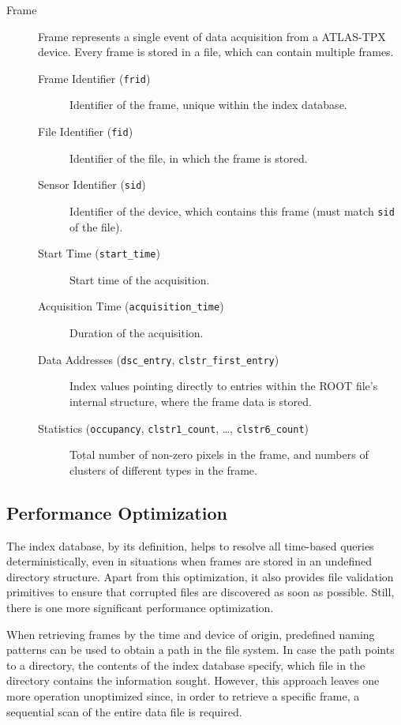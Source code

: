 \begin{description}
	\item[Frame]
	Frame represents a single event of data acquisition from a ATLAS-TPX device. Every frame is stored in a file, which can contain multiple frames.

	\begin{description}
		\item[Frame Identifier (\texttt{frid})] 
		Identifier of the frame, unique within the index database.

		\item[File Identifier (\texttt{fid})]
		Identifier of the file, in which the frame is stored.

		\item[Sensor Identifier (\texttt{sid})] 
		Identifier of the device, which contains this frame (must match \texttt{sid} of the file).

		\item[Start Time (\texttt{start\_time})] 
		Start time of the acquisition.

		\item[Acquisition Time (\texttt{acquisition\_time})] 
		Duration of the acquisition.

		\item[Data Addresses (\texttt{dsc\_entry}, \texttt{clstr\_first\_entry})]
		Index values pointing directly to entries within the ROOT file's internal structure, where the frame data is stored.

		\item[Statistics (\texttt{occupancy}, \texttt{clstr1\_count}, \dots, \texttt{clstr6\_count})]
		Total number of non-zero pixels in the frame, and numbers of clusters of different types in the frame.
	\end{description}
\end{description}

\subsection{Performance Optimization}
\label{db:performance-optimization}
The index database, by its definition, helps to resolve all time-based queries deterministically, even in situations when frames are stored in an undefined directory structure. Apart from this optimization, it also provides file validation primitives to ensure that corrupted files are discovered as soon as possible. Still, there is one more significant performance optimization.

When retrieving frames by the time and device of origin, predefined naming patterns can be used to obtain a path in the file system. In case the path points to a directory, the contents of the index database specify, which file in the directory contains the information sought. However, this approach leaves one more operation unoptimized since, in order to retrieve a specific frame, a sequential scan of the entire data file is required.

